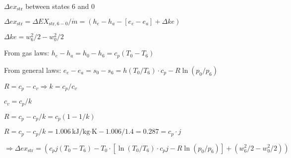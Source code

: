 \( \Delta ex_{\text{str}} \) between states 6 and 0  

\( \Delta ex_{\text{str}} = \Delta EX_{\text{str},6-0} / \dot{m} = (h_e - h_a - [e_e - e_a] + \Delta ke) \)  

\( \Delta ke = w_6^2 / 2 - w_0^2 / 2 \)  

From gas laws:  
\( h_e - h_a = h_0 - h_6 = c_p (T_0 - T_6) \)  

From general laws:  
\( e_e - e_a = s_0 - s_6 = h (T_0 / T_6) \cdot c_p - R \ln (p_0 / p_6) \)  

\( R = c_p - c_v \Rightarrow k = c_p / c_v \)  

\( c_v = c_p / k \)  

\( R = c_p - c_p / k = c_p (1 - 1/k) \)  

\( R = c_p - c_p / k = 1.006 \, \text{kJ/kg·K} - 1.006 / 1.4 = 0.287 = c_p \cdot j \)  

\( \Rightarrow \Delta ex_{\text{str}} = (c_p j (T_0 - T_6) - T_0 \cdot [\ln (T_0 / T_6) \cdot c_p j - R \ln (p_0 / p_6)] + (w_6^2 / 2 - w_0^2 / 2)) \)